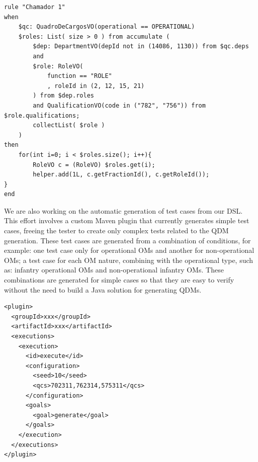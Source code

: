 \begin{lstlisting}[frame=single, language=DRL, caption={\it DRL generated}, label={code:drl}, basicstyle=\scriptsize]
rule "Chamador 1"   	
when
	$qc: QuadroDeCargosVO(operational == OPERATIONAL)	
	$roles: List( size > 0 ) from accumulate ( 
		$dep: DepartmentVO(depId not in (14086, 1130)) from $qc.deps				  		   
		and
		$role: RoleVO(
			function == "ROLE"
			, roleId in (2, 12, 15, 21)  
		) from $dep.roles 		
		and QualificationVO(code in ("782", "756")) from $role.qualifications;				
		collectList( $role )
	) 		
then		 
	for(int i=0; i < $roles.size(); i++){       	
		RoleVO c = (RoleVO) $roles.get(i);
		helper.add(1L, c.getFractionId(), c.getRoleId());   
}               
end	\end{lstlisting}


We are also working on the automatic generation of test cases 
from our DSL. This effort involves a custom Maven plugin that currently generates simple test cases, 
freeing the tester to create only complex tests related to the QDM generation. 
These test cases are generated from a combination of conditions, for example: one test case only for operational OMs 
and another for non-operational OMs; a test case for each OM nature, combining with the operational type, 
such as: infantry operational OMs and non-operational infantry OMs. These combinations are generated for simple 
cases so that they are easy to verify without the need to build a Java solution for generating QDMs. 


\begin{lstlisting}[frame=single, language=Plugin, caption={\it Maven plugin for test generation}, label={code:plugin}]
<plugin>
  <groupId>xxx</groupId>
  <artifactId>xxx</artifactId>
  <executions>
    <execution>
      <id>execute</id>			
      <configuration>
        <seed>10</seed>				
        <qcs>702311,762314,575311</qcs>				
      </configuration>
      <goals>
        <goal>generate</goal>
      </goals>
    </execution>
  </executions>
</plugin>	
\end{lstlisting}



